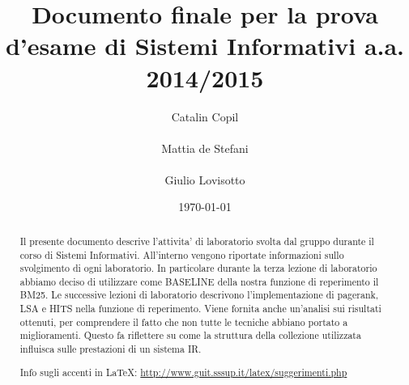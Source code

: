 \documentclass{llncs}
\begin{document}
\title{Documento finale per la prova d'esame di Sistemi Informativi
  a.a. 2014/2015} 
\author{
	Catalin Copil\\\\ 
	Mattia de Stefani\\\\ 
	Giulio Lovisotto\\} 
\institute{}

\date{\today}

\maketitle
\begin{abstract}
Il presente documento descrive l'attivita' di laboratorio svolta dal gruppo durante il corso di Sistemi Informativi. 
All'interno vengono riportate informazioni sullo svolgimento di ogni laboratorio. In particolare durante la terza lezione di laboratorio abbiamo deciso di utilizzare come BASELINE della nostra funzione di reperimento il BM25. Le successive lezioni di laboratorio descrivono l'implementazione di pagerank, LSA e HITS nella funzione di reperimento. 
Viene fornita anche un'analisi sui risultati ottenuti, per comprendere il fatto che non tutte le tecniche abbiano portato a miglioramenti. Questo fa riflettere su come la struttura della collezione utilizzata influisca sulle prestazioni di un sistema IR.


Info sugli accenti in \LaTeX : \underline{http://www.guit.sssup.it/latex/suggerimenti.php} 
	
	
\end{abstract}
\end{document}
